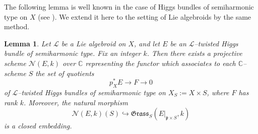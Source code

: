 \documentclass[12pt,reqno]{amsart}
\numberwithin{equation}{subsection}
\newtheorem{lem}[equation]{Lemma}
\theoremstyle{definition}
\theoremstyle{theorem}
\begin{document}
The following lemma is well known in the case of Higgs bundles of
semiharmonic type on $X$ (see \cite[\S\,9, Lemma~9.3]{CT.Simpson-1995}).
We extend it here to the setting of Lie algebroids by the same method.

\begin{lem}\label{projective scheme N(E,k) for L-twisted-Higgs bundles}
	Let $\mathcal{L}$ be a Lie algebroid on $X$, and let
	$E$ be an $\mathcal{L}$--twisted Higgs bundle of semiharmonic type.
	Fix an integer $k$.
	Then there exists a projective scheme
	$\mathcal{N}(E,k)$ over $\mathbb{C}$ representing the functor which
	associates to each $\mathbb{C}$--scheme $S$ the set of quotients
	\[
	p_X^{*}E \longrightarrow F \longrightarrow 0
	\]
	of $\mathcal{L}$--twisted Higgs bundles of semiharmonic type on
	$X_S := X \times S$, where $F$ has rank $k$.
	Moreover, the natural morphism
	\[
	\mathcal{N}(E,k)(S) \hookrightarrow
	\mathfrak{Grass}_{S}(E|_{\mathfrak{p}\times S},k)
	\]
	is a closed embedding.
\end{lem}
\end{document}
